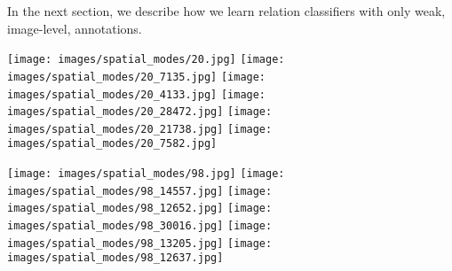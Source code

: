 \documentclass[10pt,twocolumn,letterpaper]{article}
\newcommand{\gotoline}{\vspace{.05cm}}
\begin{document}
\gotoline
\vspace{4pt}
In the next section, we describe how we learn relation classifiers with only weak, image-level, annotations.  


\begin{figure*}[t]
\centering
    \begin{minipage}[b]{\textwidth}
       \texttt{[image: images/spatial\_modes/20.jpg]}
       \texttt{[image: images/spatial\_modes/20\_7135.jpg]}
       \texttt{[image: images/spatial\_modes/20\_4133.jpg]}
       \texttt{[image: images/spatial\_modes/20\_28472.jpg]}
       \texttt{[image: images/spatial\_modes/20\_21738.jpg]}
       \texttt{[image: images/spatial\_modes/20\_7582.jpg]}
       \vspace{-2ex}
	\end{minipage}   
	    
    \begin{minipage}[b]{\textwidth}   
       \texttt{[image: images/spatial\_modes/98.jpg]}
       \texttt{[image: images/spatial\_modes/98\_14557.jpg]}
       \texttt{[image: images/spatial\_modes/98\_12652.jpg]}
       \texttt{[image: images/spatial\_modes/98\_30016.jpg]}
       \texttt{[image: images/spatial\_modes/98\_13205.jpg]}
       \texttt{[image: images/spatial\_modes/98\_12637.jpg]}
	\vspace{-1ex}
    \end{minipage}


\end{figure*}
\end{document}
